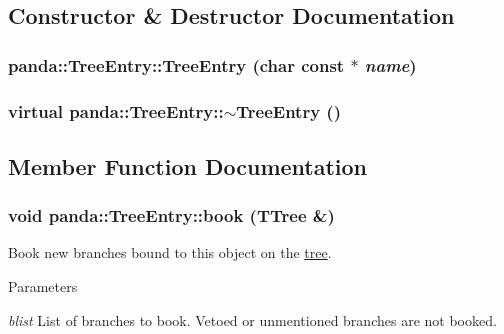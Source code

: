 \subsection{Constructor \& Destructor Documentation}
\hypertarget{classpanda_1_1TreeEntry_a3e4d2b1708db6f13525a6eff2b577b88}{
\subsubsection[{TreeEntry}]{\setlength{\rightskip}{0pt plus 5cm}panda::TreeEntry::TreeEntry (char const $\ast$ {\em name})}}
\label{classpanda_1_1TreeEntry_a3e4d2b1708db6f13525a6eff2b577b88}
\hypertarget{classpanda_1_1TreeEntry_a56aa861e9e5589723cbd45c701ca96c6}{
\subsubsection[{$\sim$TreeEntry}]{\setlength{\rightskip}{0pt plus 5cm}virtual panda::TreeEntry::$\sim$TreeEntry ()}}
\label{classpanda_1_1TreeEntry_a56aa861e9e5589723cbd45c701ca96c6}


\subsection{Member Function Documentation}
\hypertarget{classpanda_1_1TreeEntry_a2ad0cb0f4cdaca3292274a6c94f5ae2f}{
\subsubsection[{book}]{\setlength{\rightskip}{0pt plus 5cm}void panda::TreeEntry::book (TTree \&)}}
\label{classpanda_1_1TreeEntry_a2ad0cb0f4cdaca3292274a6c94f5ae2f}


Book new branches bound to this object on the \hyperlink{namespacepanda_1_1tree}{tree}. 
\begin{DoxyParams}{Parameters}
\item[{\em blist}]List of branches to book. Vetoed or unmentioned branches are not booked. \end{DoxyParams}


